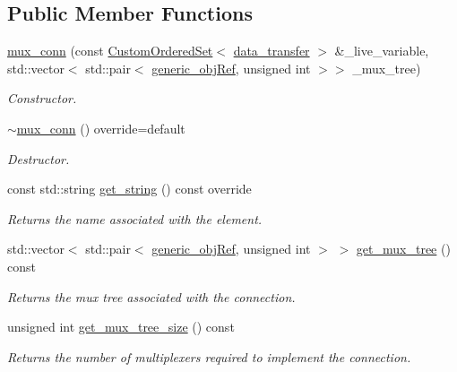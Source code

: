 \subsection*{Public Member Functions}
\begin{DoxyCompactItemize}
\item 
\hyperlink{classmux__conn_a3616b9557bc1ac18705d4843db42cfcd}{mux\+\_\+conn} (const \hyperlink{classCustomOrderedSet}{Custom\+Ordered\+Set}$<$ \hyperlink{conn__binding_8hpp_ae44ffa64566f2bb3ce6941833ac940fb}{data\+\_\+transfer} $>$ \&\+\_\+live\+\_\+variable, std\+::vector$<$ std\+::pair$<$ \hyperlink{generic__obj_8hpp_acb533b2ef8e0fe72e09a04d20904ca81}{generic\+\_\+obj\+Ref}, unsigned int $>$$>$ \+\_\+mux\+\_\+tree)
\begin{DoxyCompactList}\small\item\em Constructor. \end{DoxyCompactList}\item 
\hyperlink{classmux__conn_a1c99a9d926db261e3d353189591fa4bd}{$\sim$mux\+\_\+conn} () override=default
\begin{DoxyCompactList}\small\item\em Destructor. \end{DoxyCompactList}\item 
const std\+::string \hyperlink{classmux__conn_ad3ca34b3bb987ccde2bfbf099473514d}{get\+\_\+string} () const override
\begin{DoxyCompactList}\small\item\em Returns the name associated with the element. \end{DoxyCompactList}\item 
std\+::vector$<$ std\+::pair$<$ \hyperlink{generic__obj_8hpp_acb533b2ef8e0fe72e09a04d20904ca81}{generic\+\_\+obj\+Ref}, unsigned int $>$ $>$ \hyperlink{classmux__conn_a5fa62809bdf5a41b24ccc07825bacef4}{get\+\_\+mux\+\_\+tree} () const
\begin{DoxyCompactList}\small\item\em Returns the mux tree associated with the connection. \end{DoxyCompactList}\item 
unsigned int \hyperlink{classmux__conn_aa69d99d401fef74eb1b37cbadf9c9fcd}{get\+\_\+mux\+\_\+tree\+\_\+size} () const
\begin{DoxyCompactList}\small\item\em Returns the number of multiplexers required to implement the connection. \end{DoxyCompactList}\end{DoxyCompactItemize}
